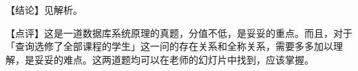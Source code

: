 \documentclass[UTF8]{ctexart}
\begin{document}
\vspace{1em}

{\color{cyan!80!black}
【结论】见解析。

【点评】这是一道数据库系统原理的真题，分值不低，是妥妥的重点。而且，对于「查询选修了全部课程的学生」这一问的存在关系和全称关系，需要多多加以理解，是妥妥的难点。这两道题均可以在老师的幻灯片中找到，应该掌握。
}

\BgThispage
\end{document}
